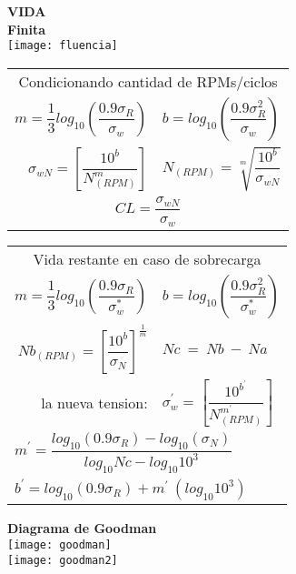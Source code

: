 \documentclass[11pt,a4paper]{article}
\begin{document}
\begin{multicols}{2}
\begin{cajita}
	\newpage
	
	\textbf{VIDA}\\
	\textbf{Finita}\\
	

	\texttt{[image: fluencia]}
	
	
	
	
	
	\begin{tabular}{r l }
		\multicolumn{2}{c}{Condicionando cantidad de RPMs/ciclos}\\
		$m=\dfrac{1}{3}log_{10}\left(\dfrac{0.9\sigma_{R}}{\sigma_{w}}\right)$&
		$b=log_{10}\left(\dfrac{0.9\sigma_{R}^{2}}{\sigma_{w}}\right)$\\[0.5cm]
		$\sigma_{wN}=\left[\dfrac{10^{b}}{N_{(RPM)}^{m}}\right]$& $N_{(RPM)}=\sqrt[m]{\dfrac{10^{b}}{\sigma_{wN}}}$\\[0.5cm]
		\multicolumn{2}{c}{$CL=\dfrac{\sigma_{wN}}{\sigma_{w}}$}\\
	\end{tabular}

	\begin{tabular}{r l }
		\multicolumn{2}{c}{Vida restante en caso de sobrecarga}\\[0.2cm]
		$m=\dfrac{1}{3}log_{10}\left(\dfrac{0.9\sigma_{R}}{\sigma_{w}^{*}}\right)$&
		$b=log_{10}\left(\dfrac{0.9\sigma_{R}^{2}}{\sigma_{w}^{*}}\right)$\\[0.5cm]
		$Nb_{(RPM)}=\left[\dfrac{10^{b}}{\sigma_{N}}\right]^{\frac{1}{m}}$&$Nc~=~Nb~-~Na$\\
		la nueva tension: & $\sigma_{w}^{'}=\left[\dfrac{10^{b^{'}}}{N_{(RPM)}^{m^{'}}}\right]$\\[0.5cm]
		\multicolumn{2}{l}{$m^{'}=\dfrac{log_{10}(0.9\sigma_{R})-log_{10}(\sigma_{N})}{log_{10}Nc-log_{10}10^{3}}$}\\[0.3cm]
		\multicolumn{2}{l}{$b^{'}=log_{10}(0.9\sigma_{R})+m^{'}~(log_{10}10^{3})$}\\[0.25cm]
		
	\end{tabular}
\newpage
	\textbf{Diagrama de Goodman}\\
\texttt{[image: goodman]}\\
\texttt{[image: goodman2]}\\


\end{cajita}
\end{multicols}
\end{document}
